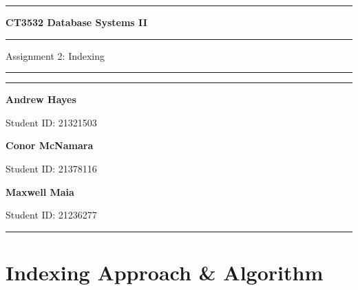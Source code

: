 \documentclass[a4paper,11pt]{article}
\author{Andrew Hayes, Conor McNamara, Maxwell Maia}
\begin{document}
\begin{titlepage}
    \begin{center}
        \hrule
        \vspace*{0.6cm}
        \huge \textbf{CT3532 Database Systems II}
        \vspace*{0.6cm}
        \hrule
        \LARGE
        \vspace{0.5cm}
            Assignment 2: Indexing
        \vspace{0.5cm}
        \hrule
            
        \vfill
        \vfill

        \Large
       \vspace{0.5cm}
       \hrule
       \vspace{0.5cm}

        \raggedright
        \begin{minipage}{0.329\textwidth}
        \centering
        \textbf{Andrew Hayes}
        
        \normalsize
        Student ID: 21321503
        \end{minipage}
        \begin{minipage}{0.329\textwidth}
        \centering
        \textbf{Conor McNamara}
        
        \normalsize
        Student ID: 21378116
        \end{minipage}
        \begin{minipage}{0.329\textwidth}
        \centering
        \textbf{Maxwell Maia}
        
        \normalsize
        Student ID: 21236277
        \end{minipage}

        \centering

        \vspace{0.5cm}
        \hrule
    \end{center}
\end{titlepage}

\newpage
\tableofcontents
\newpage
\setcounter{page}{1}

\newpage
\section{Indexing Approach \& Algorithm}
\end{document}
